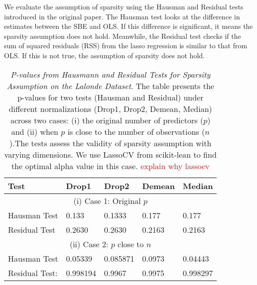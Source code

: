 We evaluate the assumption of sparsity using the Hausman and Residual tests introduced in the original paper. The Hausman test looks at the difference in estimates between the SBE and OLS. If this difference is significant, it means the sparsity assumption does not hold. Meanwhile, the Residual test checks if the sum of squared residuals (RSS) from the lasso regression is similar to that from OLS. If this is not true, the assumption of sparsity does not hold. \\

\begin{table}[h!]
\renewcommand{\arraystretch}{1.5}
\centering
\begin{tabular}{||l l l l l||} 
 \hline
 \hline
 Test & Drop1 & Drop2 &  Demean & Median \\ [0.5ex] 
 \hline \hline
 \multicolumn{5}{||c||}{(i) Case 1: Original $p$} \\ [0.5ex]
 Hausman Test & 0.133 & 0.1333 & 0.177 & 0.177 \\ 
 Residual Test & 0.2630 & 0.2630 & 0.2163 & 0.2163 \\
 \hline
 \multicolumn{5}{||c||}{(ii) Case 2: $p$ close to $n$} \\ [0.5ex]
 Hausman Test & 0.05339 & 0.085871 & 0.0973 & 0.04443 \\ 
 Residual Test: & 0.998194 & 0.9967  & 0.9975 & 0.998297 \\ [1ex] 
 \hline \hline
\end{tabular}
\caption{\textit{P-values from Hausmann and Residual Tests for Sparsity Assumption on the Lalonde Dataset}. The table presents the p-values for two tests (Hausman and Residual) under different normalizations (Drop1, Drop2, Demean, Median) across two cases: (i) the original number of predictors ($p$) and (ii) when $p$ is close to the number of observations ($n$).The tests assess the validity of sparsity assumption with varying dimensions. We use LassoCV from scikit-lean to find the optimal alpha value in this case. \textcolor{red}{explain why lassocv}}


\label{table:1}
\end{table}

